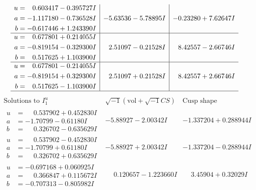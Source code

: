 \documentclass[1p]{elsarticle_modified}
\theoremstyle{definition}
\newcommand{\I}{\sqrt{-1}}
\begin{document}
$$\begin{array}{c|c|c}
\begin{aligned}
u &= \phantom{-}0.603417 - 0.395727 I \\
a &= -1.117180 - 0.736528 I \\
b &= -0.617446 + 1.243390 I\end{aligned}
 & -5.63536 - 5.78895 I & -0.23280 + 7.62647 I \\ \hline\begin{aligned}
u &= \phantom{-}0.677801 + 0.214055 I \\
a &= -0.819154 - 0.329300 I \\
b &= \phantom{-}0.517625 + 1.103900 I\end{aligned}
 & \phantom{-}2.51097 - 0.21528 I & \phantom{-}8.42557 - 2.66746 I \\ \hline\begin{aligned}
u &= \phantom{-}0.677801 - 0.214055 I \\
a &= -0.819154 + 0.329300 I \\
b &= \phantom{-}0.517625 - 1.103900 I\end{aligned}
 & \phantom{-}2.51097 + 0.21528 I & \phantom{-}8.42557 + 2.66746 I\\
 \hline 
 \end{array}$$\newpage$$\begin{array}{c|c|c}  
\text{Solutions to }I^u_{1}& \I (\text{vol} + \sqrt{-1}CS) & \text{Cusp shape}\\
 \hline 
\begin{aligned}
u &= \phantom{-}0.537902 + 0.452830 I \\
a &= -1.70799 - 0.61180 I \\
b &= \phantom{-}0.326702 - 0.635629 I\end{aligned}
 & -5.88927 - 2.00342 I & -1.337204 + 0.288944 I \\ \hline\begin{aligned}
u &= \phantom{-}0.537902 - 0.452830 I \\
a &= -1.70799 + 0.61180 I \\
b &= \phantom{-}0.326702 + 0.635629 I\end{aligned}
 & -5.88927 + 2.00342 I & -1.337204 - 0.288944 I \\ \hline\begin{aligned}
u &= -0.697168 + 0.060925 I \\
a &= \phantom{-}0.366847 + 0.115672 I \\
b &= -0.707313 - 0.805982 I\end{aligned}
 & \phantom{-}0.120657 - 1.223660 I & \phantom{-}3.45904 + 0.32029 I \\ \hline\begin{aligned}

\end{aligned}
\end{array}$$
\end{document}
